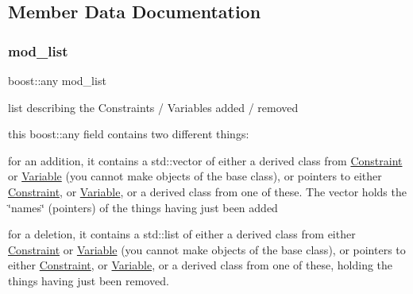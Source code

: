 \subsection{Member Data Documentation}
\mbox{\label{class_s_m_spp__di__unipi__it_1_1_block_mod_a_d_af9bc92f775d5cfac36b1ab880f620127}} 
\subsubsection{\texorpdfstring{mod\+\_\+list}{mod\_list}}
{\footnotesize\ttfamily boost\+::any mod\+\_\+list}



list describing the Constraints / Variables added / removed 

this boost\+::any field contains two different things\+:


\begin{DoxyItemize}
\item for an addition, it contains a std\+::vector of either a derived class from \mbox{\hyperlink{class_s_m_spp__di__unipi__it_1_1_constraint}{Constraint}} or \mbox{\hyperlink{class_s_m_spp__di__unipi__it_1_1_variable}{Variable}} (you cannot make objects of the base class), or pointers to either \mbox{\hyperlink{class_s_m_spp__di__unipi__it_1_1_constraint}{Constraint}}, or \mbox{\hyperlink{class_s_m_spp__di__unipi__it_1_1_variable}{Variable}}, or a derived class from one of these. The vector holds the \char`\"{}names\char`\"{} (pointers) of the things having just been added
\item for a deletion, it contains a std\+::list of either a derived class from either \mbox{\hyperlink{class_s_m_spp__di__unipi__it_1_1_constraint}{Constraint}} or \mbox{\hyperlink{class_s_m_spp__di__unipi__it_1_1_variable}{Variable}} (you cannot make objects of the base class), or pointers to either \mbox{\hyperlink{class_s_m_spp__di__unipi__it_1_1_constraint}{Constraint}}, or \mbox{\hyperlink{class_s_m_spp__di__unipi__it_1_1_variable}{Variable}}, or a derived class from one of these, holding the things having just been removed. 
\end{DoxyItemize}\mbox{\label{class_s_m_spp__di__unipi__it_1_1_block_mod_a_d_a2e044cee2bbf96e34295a5b568d609bb}} 
